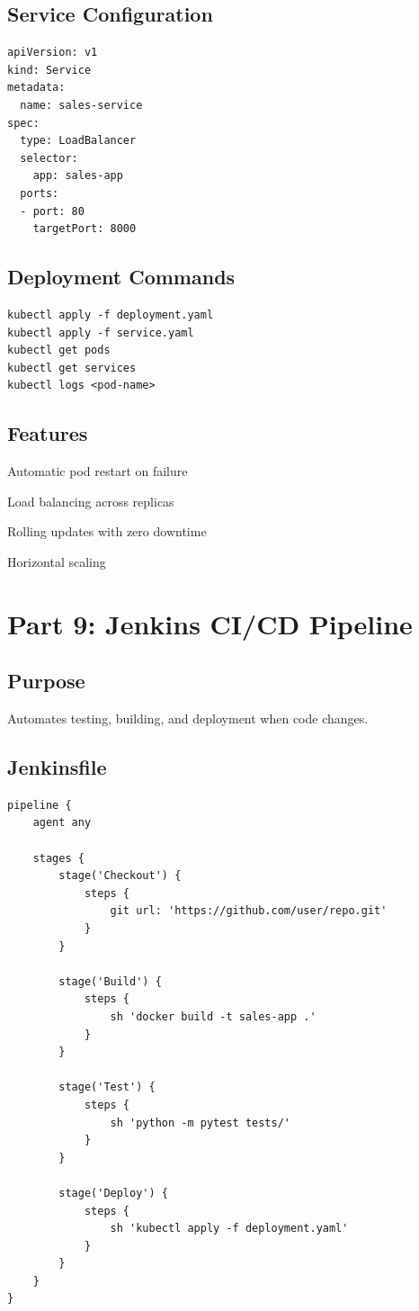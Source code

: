 \documentclass{article}
\begin{document}
\subsection{Service Configuration}

\begin{verbatim}
apiVersion: v1
kind: Service
metadata:
  name: sales-service
spec:
  type: LoadBalancer
  selector:
    app: sales-app
  ports:
  - port: 80
    targetPort: 8000
\end{verbatim}

\subsection{Deployment Commands}

\begin{verbatim}
kubectl apply -f deployment.yaml
kubectl apply -f service.yaml
kubectl get pods
kubectl get services
kubectl logs <pod-name>
\end{verbatim}

\subsection{Features}

Automatic pod restart on failure

Load balancing across replicas

Rolling updates with zero downtime

Horizontal scaling

\section{Part 9: Jenkins CI/CD Pipeline}

\subsection{Purpose}

Automates testing, building, and deployment when code changes.

\subsection{Jenkinsfile}

\begin{verbatim}
pipeline {
    agent any
    
    stages {
        stage('Checkout') {
            steps {
                git url: 'https://github.com/user/repo.git'
            }
        }
        
        stage('Build') {
            steps {
                sh 'docker build -t sales-app .'
            }
        }
        
        stage('Test') {
            steps {
                sh 'python -m pytest tests/'
            }
        }
        
        stage('Deploy') {
            steps {
                sh 'kubectl apply -f deployment.yaml'
            }
        }
    }
}
\end{verbatim}
\end{document}
